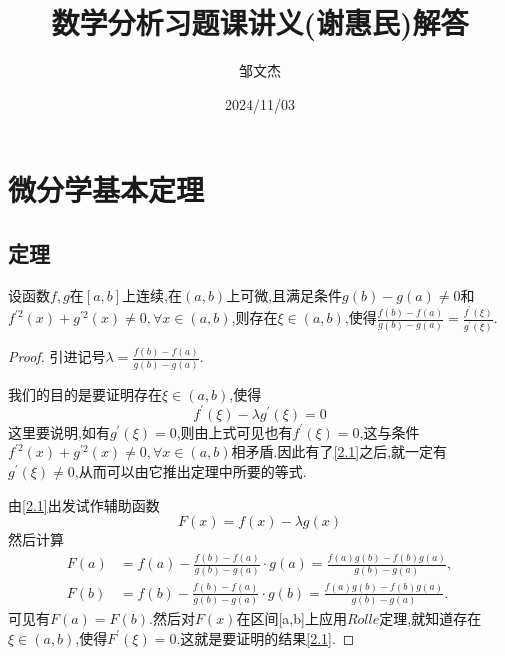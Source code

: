 \documentclass[lang=cn,newtx,10pt,scheme=chinese]{elegantbook}
\title{数学分析习题课讲义(谢惠民)解答}
\author{邹文杰}
\date{2024/11/03}
\begin{document}
\maketitle
\frontmatter

\tableofcontents

\mainmatter
\everymath{\displaystyle} %



\chapter{微分学基本定理}

\section{定理}

\begin{theorem}\label{the:2.1}
设函数$f,g$在$[a,b]$上连续,在$(a,b)$上可微,且满足条件$g(b)-g(a)\neq0$和$f^{\prime2}(x)+g^{\prime2}(x)\neq0,\forall x\in(a,b)$,则存在$\xi\in(a,b)$,使得$\frac{f(b)-f(a)}{g(b)-g(a)}=\frac{f^{\prime}(\xi)}{g^{\prime}(\xi)}$.
\end{theorem}
\begin{proof}
    引进记号$\lambda=\frac{f(b)-f(a)}{g(b)-g(a)}$.
    
    我们的目的是要证明存在$\xi\in(a,b)$,使得
    \begin{equation}\label{2.1}
        f^{\prime}(\xi)-\lambda g^{\prime}(\xi)=0
    \end{equation}
这里要说明,如有$g^{\prime}(\xi)=0$,则由上式可见也有$f^{\prime}(\xi)=0$,这与条件$f^{\prime2}(x)+g^{\prime2}(x)\neq0,\forall x\in(a,b)$相矛盾.因此有了\eqref{2.1}之后,就一定有$g^{\prime}(\xi)\neq0$,从而可以由它推出定理中所要的等式.

由\eqref{2.1}出发试作辅助函数
\begin{equation}
    F(x)=f(x)-\lambda g(x)
    \nonumber
\end{equation}
然后计算
\begin{align*}
F(a)&=f(a)-\frac{f(b)-f(a)}{g(b)-g(a)}\cdot g(a)=\frac{f(a)g(b)-f(b)g(a)}{g(b)-g(a)},\\
F(b)&=f(b)-\frac{f(b)-f(a)}{g(b)-g(a)}\cdot g(b)=\frac{f(a)g(b)-f(b)g(a)}{g(b)-g(a)}.
\end{align*}
可见有$F(a)=F(b)$.然后对$F(x)$在区间[a,b]上应用$Rolle$定理,就知道存在$\xi\in(a,b)$,使得$F^{\prime}(\xi)=0$.这就是要证明的结果\eqref{2.1}.
\end{proof}
\end{document}
